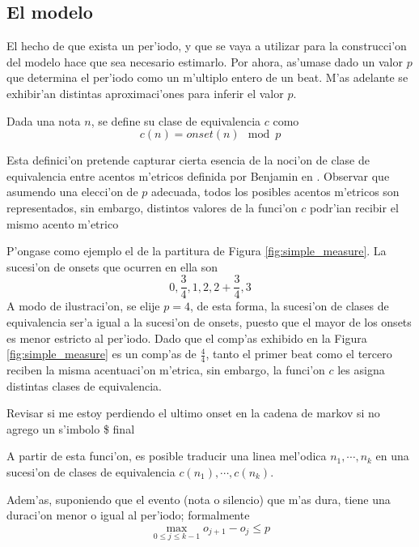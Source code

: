 \subsection{El modelo}
El hecho de que exista un per'iodo, y que se vaya a utilizar para la construcci'on del modelo hace que sea necesario estimarlo. Por ahora, as'umase dado un valor 
$p$ que determina el per'iodo como un m'ultiplo entero de un beat. M'as adelante se exhibir'an distintas aproximaci'ones para inferir el valor $p$.

\begin{definition}
Dada una nota $n$, se define su clase de equivalencia $c$ como $$c(n) = onset(n)\mod p$$
\end{definition}

Esta definici'on pretende capturar cierta esencia de la noci'on de clase de equivalencia entre acentos m'etricos definida por Benjamin en \cite{Benjamin84}. Observar que asumendo 
una elecci'on de $p$ adecuada, todos los posibles acentos m'etricos son representados, sin embargo, distintos valores de la funci'on $c$ podr'ian recibir el mismo acento m'etrico 

P'ongase como ejemplo el de la partitura de Figura \ref{fig:simple_measure}. La sucesi'on de onsets que ocurren en ella son 
$$0, \frac{3}{4}, 1, 2, 2+\frac{3}{4}, 3$$ 
A modo de ilustraci'on, se elije $p=4$, de esta forma, la sucesi'on de clases de equivalencia ser'a igual a la sucesi'on de onsets, puesto que el mayor de los onsets es menor 
estricto al per'iodo. Dado que el comp'as exhibido en la Figura \ref{fig:simple_measure} es un comp'as de $\frac{4}{4}$, tanto el primer beat como el tercero reciben la misma 
acentuaci'on m'etrica, sin embargo, la funci'on $c$ les asigna distintas clases de equivalencia.

\alert{Revisar si me estoy perdiendo el ultimo onset en la cadena de markov si no agrego un s'imbolo \$ final}

\begin{imagen}
\end{imagen}

A partir de esta funci'on, es posible traducir una linea mel'odica $n_1,\cdots,n_k$ en una sucesi'on de clases de equivalencia $c(n_1),\cdots,c(n_k)$. 

Adem'as, suponiendo que el evento (nota o silencio) que m'as dura, tiene una duraci'on menor o igual al per'iodo; formalmente 
$$\max_{0\leq j \leq k-1}o_{j+1}-o_j \leq p$$ 

